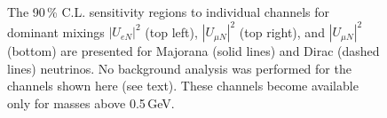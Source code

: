 
\begin{figure}[t]
	\centering
	{\resizebox{\linewidth}{!}{}}
	\vspace{0.05em}

	{\resizebox{\linewidth}{!}{}}
	\caption[Sensitivity regions to individual channels for dominant mixings without background analysis]%
		{The 90\,\% C.L. sensitivity regions to individual channels for dominant mixings %
		$|U_{e N}|^2$ (top left), $|U_{\mu N}|^2$ (top right), and $|U_{\mu N}|^2$ (bottom) are presented for Majorana (solid lines) %
		and Dirac (dashed lines) neutrinos.
		No background analysis was performed for the channels shown here (see text).
		These channels become available only for masses above 0.5\,GeV.  }
	\label{fig:senseV}
\end{figure}

